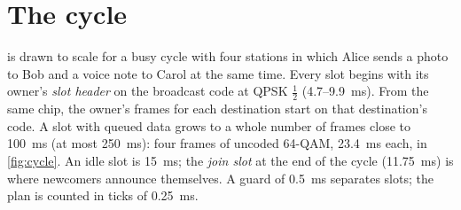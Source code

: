 \documentclass[11pt,a4paper,oneside]{report}
\begin{document}
\section{The cycle}\label{sec:cycle}
 is drawn to scale for a busy cycle with four stations in which Alice sends a photo to
Bob and a voice note to Carol at the same time. Every slot begins with its owner's \emph{slot header}
on the broadcast code at QPSK $\tfrac12$ (4.7--\SI{9.9}{ms}). From the same chip, the owner's frames for
each destination start on that destination's code. A slot with queued data grows to a whole number
of frames close to \SI{100}{ms} (at most \SI{250}{ms}): four frames of uncoded 64-QAM, \SI{23.4}{ms}
each, in \cref{fig:cycle}. An idle slot is \SI{15}{ms}; the \emph{join slot} at the end of the cycle
(\SI{11.75}{ms}) is where newcomers announce themselves. A guard of \SI{0.5}{ms} separates slots; the
plan is counted in ticks of \SI{0.25}{ms}.
\end{document}

